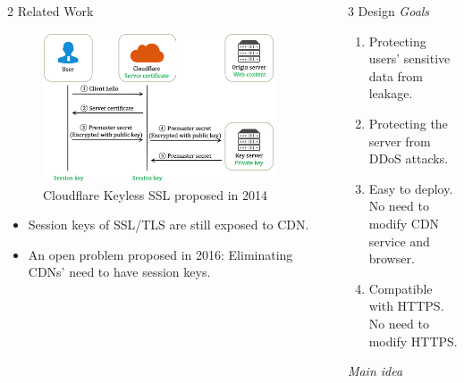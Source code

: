 \documentclass[final]{beamer}
\newlength{\sepwid}
\newlength{\onecolwid}
\newcommand{\vtopsep}[0]{\vspace{0.2ex}}
\begin{document}
\begin{frame}[t]
\begin{columns}[t]
\begin{column}{\onecolwid}
			\begin{block}{2 Related Work}
				\begin{figure}
					\includegraphics[width=\linewidth]{figures/keyless.png}
					\caption{Cloudflare Keyless SSL proposed in 2014}
				\end{figure}
				\begin{itemize}
					\item Session keys of SSL/TLS are still exposed to CDN.
					\item An open problem proposed in 2016\footnotemark[1]: Eliminating CDNs' need to have session keys.
				\end{itemize}
			\end{block}
																					        
																					 
		\end{column} %
		\begin{column}{\sepwid}\end{column} %
																																				        
		\begin{column}{\onecolwid} %
			\begin{block}{3 Design}
				\textit{Goals}
				\vtopsep
				\begin{enumerate}
					\item Protecting users' sensitive data from leakage.
					\item Protecting the server from DDoS attacks.
					\item Easy to deploy. No need to modify CDN service and browser.
					\item Compatible with HTTPS. No need to modify HTTPS.
				\end{enumerate}	
				\vtopsep
				\textit{Main idea}
																												

\end{block}
\end{column}
\end{columns}
\end{frame}
\end{document}
